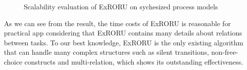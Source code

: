 \documentclass{llncs}
\begin{document}
\begin{figure}[htbp]
\centering
{}
\caption[Scalability evaluation of ExRORU]{Scalability evaluation of ExRORU on sychesized process models \label{fig:scalability}}
\end{figure}

As we can see from the result, the time costs of ExRORU is reasonable for practical app considering that ExRORU contains many details about relations between tasks. To our best knowledge, ExRORU is the only existing algorithm that can handle many complex structures such as silent transitions, non-free-choice constructs and multi-relation, which shows its outstanding effectiveness.
\end{document}
